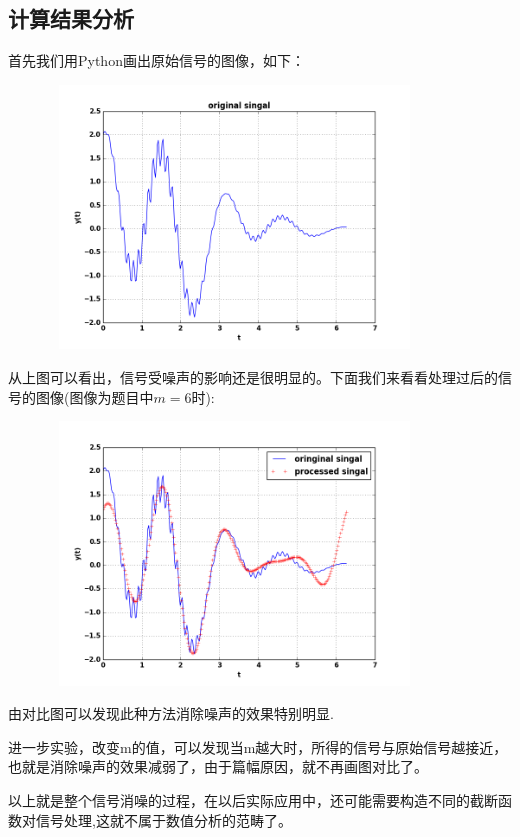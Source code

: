 \documentclass[10pt,a4paper]{ctexart}
\begin{document}
\subsection{计算结果分析}
首先我们用Python画出原始信号的图像，如下：
\par
\centerline{\includegraphics[height=7cm,width=12cm]{singal0.png}}
\par
从上图可以看出，信号受噪声的影响还是很明显的。下面我们来看看处理过后的信号的图像(图像为题目中$m=6$时):
\par
\centerline{\includegraphics[height=7cm,width=12cm]{singal1.png}}
\par
由对比图可以发现此种方法消除噪声的效果特别明显.

进一步实验，改变m的值，可以发现当m越大时，所得的信号与原始信号越接近，也就是消除噪声的效果减弱了，由于篇幅原因，就不再画图对比了。

以上就是整个信号消噪的过程，在以后实际应用中，还可能需要构造不同的截断函数对信号处理,这就不属于数值分析的范畴了。
\end{document}
